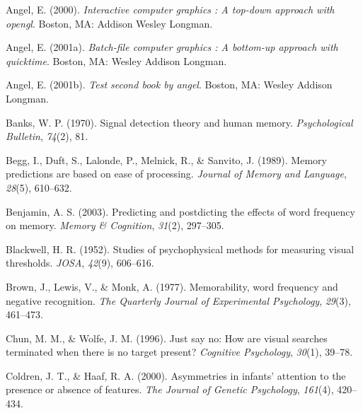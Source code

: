 \documentclass[12pt,twoside]{reedthesis}
\begin{document}

\noindent

\setlength{\parindent}{-0.20in}
\setlength{\leftskip}{0.20in}
\setlength{\parskip}{8pt}

\hypertarget{refs}{}
\leavevmode\hypertarget{ref-angel2000}{}%
Angel, E. (2000). \emph{Interactive computer graphics : A top-down approach with opengl}. Boston, MA: Addison Wesley Longman.

\leavevmode\hypertarget{ref-angel2001}{}%
Angel, E. (2001a). \emph{Batch-file computer graphics : A bottom-up approach with quicktime}. Boston, MA: Wesley Addison Longman.

\leavevmode\hypertarget{ref-angel2002a}{}%
Angel, E. (2001b). \emph{Test second book by angel}. Boston, MA: Wesley Addison Longman.

\leavevmode\hypertarget{ref-banks1970signal}{}%
Banks, W. P. (1970). Signal detection theory and human memory. \emph{Psychological Bulletin}, \emph{74}(2), 81.

\leavevmode\hypertarget{ref-begg1989memory}{}%
Begg, I., Duft, S., Lalonde, P., Melnick, R., \& Sanvito, J. (1989). Memory predictions are based on ease of processing. \emph{Journal of Memory and Language}, \emph{28}(5), 610--632.

\leavevmode\hypertarget{ref-benjamin2003predicting}{}%
Benjamin, A. S. (2003). Predicting and postdicting the effects of word frequency on memory. \emph{Memory \& Cognition}, \emph{31}(2), 297--305.

\leavevmode\hypertarget{ref-blackwell1952studies}{}%
Blackwell, H. R. (1952). Studies of psychophysical methods for measuring visual thresholds. \emph{JOSA}, \emph{42}(9), 606--616.

\leavevmode\hypertarget{ref-brown1977memorability}{}%
Brown, J., Lewis, V., \& Monk, A. (1977). Memorability, word frequency and negative recognition. \emph{The Quarterly Journal of Experimental Psychology}, \emph{29}(3), 461--473.

\leavevmode\hypertarget{ref-chun1996just}{}%
Chun, M. M., \& Wolfe, J. M. (1996). Just say no: How are visual searches terminated when there is no target present? \emph{Cognitive Psychology}, \emph{30}(1), 39--78.

\leavevmode\hypertarget{ref-coldren2000asymmetries}{}%
Coldren, J. T., \& Haaf, R. A. (2000). Asymmetries in infants' attention to the presence or absence of features. \emph{The Journal of Genetic Psychology}, \emph{161}(4), 420--434.
\end{document}
